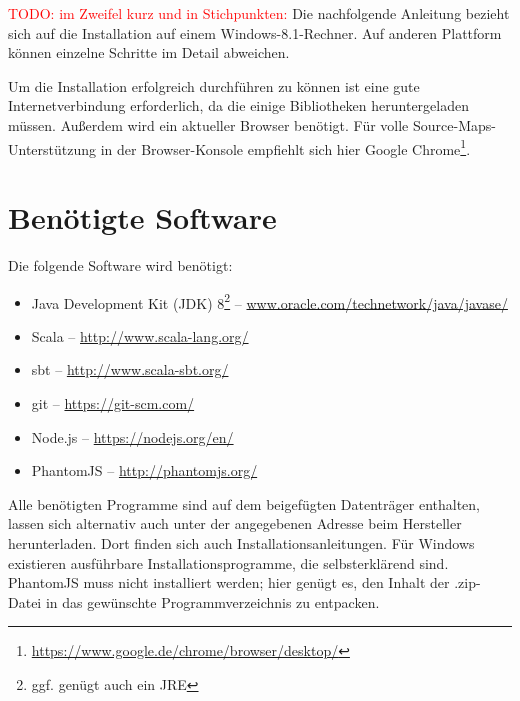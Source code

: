 \documentclass[a4paper, 12pt, hidelinks, listof=totoc, listoftables=totoc, bibliography=totoc]{scrreprt}
\newcommand{\TODO}[1]{\textcolor{red}{#1}\newline}
\begin{document}
\TODO{TODO: im Zweifel kurz und in Stichpunkten:}
Die nachfolgende Anleitung bezieht sich auf die Installation auf einem Windows-8.1-Rechner. Auf anderen Plattform können einzelne Schritte im Detail abweichen.

Um die Installation erfolgreich durchführen zu können ist eine gute Internetverbindung erforderlich, da die einige Bibliotheken heruntergeladen müssen. Außerdem wird ein aktueller Browser benötigt. Für volle Source-Maps-Unterstützung in der Browser-Konsole empfiehlt sich hier Google Chrome\footnote{\url{https://www.google.de/chrome/browser/desktop/}}.

\section{Benötigte Software}

Die folgende Software wird benötigt:

\begin{itemize}
	\item Java Development Kit (JDK) 8\footnote{ggf. genügt auch ein JRE}  --  \url{www.oracle.com/technetwork/java/javase/}
	\item Scala  --  \url{http://www.scala-lang.org/}
	\item sbt  --  \url{http://www.scala-sbt.org/}
	\item git  --  \url{https://git-scm.com/}
	\item Node.js  --  \url{https://nodejs.org/en/}
	\item PhantomJS  --  \url{http://phantomjs.org/}
\end{itemize}

Alle benötigten Programme sind auf dem beigefügten Datenträger enthalten, lassen sich alternativ auch unter der angegebenen Adresse beim Hersteller herunterladen. Dort finden sich auch Installationsanleitungen. Für Windows existieren ausführbare Installationsprogramme, die selbsterklärend sind. PhantomJS muss nicht installiert werden; hier genügt es, den Inhalt der .zip-Datei in das gewünschte Programmverzeichnis zu entpacken.
\end{document}
